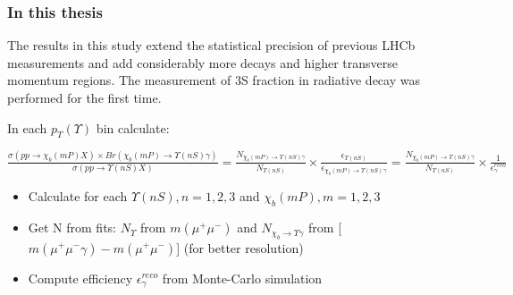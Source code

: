 \begin{frame}
\frametitle{In this thesis}

The results in this study extend the statistical precision of 
previous LHCb measurements and add considerably more decays and higher transverse
momentum regions.  The measurement of \Y3S fraction in radiative \chibThreeP
decay was performed for the first time.
\bigskip

In each $p_T(\Upsilon)$ bin calculate:
\begin{center}
$
\frac{\sigma(pp \to \chi_b (mP) X) \times Br (\chi_b (mP) \to \Upsilon(nS) \gamma)}{\sigma(pp \to \Upsilon(nS) X)} =
\frac{N_{\chi_b (mP)\to \Upsilon(nS) \gamma}}{N_{\Upsilon(nS)}} \times \frac{\epsilon_{\Upsilon(nS)}}{\epsilon_{\chi_b (mP)\to \Upsilon(nS) \gamma}} =
\frac{N_{\chi_b (mP)\to \Upsilon(nS) \gamma}}{N_{\Upsilon(nS)}} \times \frac{1}{\epsilon^{reco}_{\gamma}}
$
\end{center}
\begin{itemize}
  \item Calculate for each $\Upsilon(nS), n=1,2,3$ and $\chi_b(mP), m=1,2,3$
  \item Get N from fits: $N_{\Upsilon}$ from  $m(\mu^+ \mu^-)$ and $N_{\chi_b \rightarrow \Upsilon \gamma}$ from [$m(\mu^+ \mu^- \gamma) - m(\mu^+ \mu^-)$] (for better resolution)
  \item Compute efficiency $\epsilon^{reco}_{\gamma}$  from Monte-Carlo simulation
\end{itemize}
\end{frame}